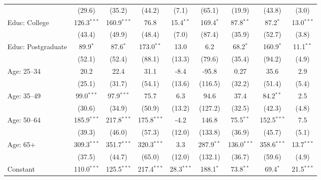 \begin{adjustbox}{width = \textwidth, center}
\begin{tabular}{lcccccccc}
                              & (29.6)        & (35.2)        & (44.2)        & (7.1)         & (65.1)        & (19.9)        & (43.8)        & (3.0)\\   
      Educ: College           & 126.3$^{***}$ & 160.9$^{***}$ & 76.8          & 15.4$^{**}$   & 169.4$^{*}$   & 87.8$^{**}$   & 87.2$^{*}$    & 13.0$^{***}$\\   
                              & (43.4)        & (49.9)        & (48.4)        & (7.0)         & (87.4)        & (35.9)        & (52.7)        & (3.8)\\   
      Educ: Postgraduate      & 89.9$^{*}$    & 87.6$^{*}$    & 173.0$^{**}$  & 13.0          & 6.2           & 68.2$^{*}$    & 160.9$^{*}$   & 11.1$^{**}$\\   
                              & (52.1)        & (52.4)        & (88.1)        & (13.3)        & (79.6)        & (35.4)        & (94.2)        & (4.9)\\   
      Age: 25--34             & 20.2          & 22.4          & 31.1          & -8.4          & -95.8         & 0.27          & 35.6          & 2.9\\   
                              & (25.1)        & (31.7)        & (54.1)        & (13.6)        & (116.5)       & (32.2)        & (51.4)        & (5.4)\\   
      Age: 35--49             & 99.0$^{***}$  & 97.9$^{***}$  & 75.7          & 6.3           & 94.6          & 37.4          & 84.2$^{**}$   & 2.5\\   
                              & (30.6)        & (34.9)        & (50.9)        & (13.2)        & (127.2)       & (32.5)        & (42.3)        & (4.8)\\   
      Age: 50--64             & 185.9$^{***}$ & 217.8$^{***}$ & 175.8$^{***}$ & -4.2          & 146.8         & 75.5$^{**}$   & 152.5$^{***}$ & 7.5\\   
                              & (39.3)        & (46.0)        & (57.3)        & (12.0)        & (133.8)       & (36.9)        & (45.7)        & (5.1)\\   
      Age: 65+                & 309.3$^{***}$ & 351.7$^{***}$ & 320.3$^{***}$ & 3.3           & 287.9$^{**}$  & 136.0$^{***}$ & 358.6$^{***}$ & 13.7$^{***}$\\   
                              & (37.5)        & (44.7)        & (65.0)        & (12.0)        & (132.1)       & (36.7)        & (59.6)        & (4.9)\\   
      Constant                & 110.0$^{***}$ & 125.5$^{***}$ & 217.4$^{***}$ & 28.3$^{***}$  & 188.1$^{*}$   & 73.8$^{**}$   & 69.4$^{*}$    & 21.5$^{***}$\\   

\end{tabular}
\end{adjustbox}
